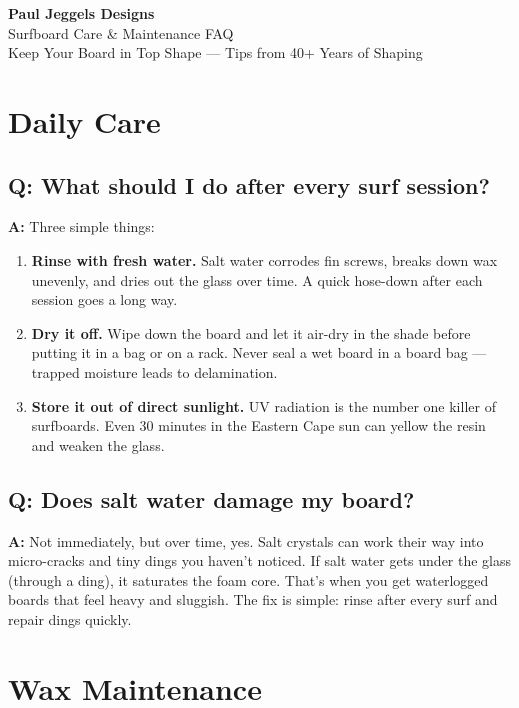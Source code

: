 \documentclass[11pt,a4paper]{article}
\newcommand{\question}[1]{\subsection*{Q: #1}}
\newcommand{\answer}{\noindent\textbf{A:} }
\begin{document}
\begin{center}
{\LARGE\bfseries\color{pjdnavy} Paul Jeggels Designs}\\[6pt]
{\Large\color{pjdnavy} Surfboard Care \& Maintenance FAQ}\\[4pt]
{\small\color{gray} Keep Your Board in Top Shape --- Tips from 40+ Years of Shaping}
\end{center}

\vspace{1em}

\section{Daily Care}

\question{What should I do after every surf session?}
\answer Three simple things:
\begin{enumerate}[leftmargin=1.5em]
    \item \textbf{Rinse with fresh water.} Salt water corrodes fin screws, breaks down wax unevenly, and dries out the glass over time. A quick hose-down after each session goes a long way.
    \item \textbf{Dry it off.} Wipe down the board and let it air-dry in the shade before putting it in a bag or on a rack. Never seal a wet board in a board bag --- trapped moisture leads to delamination.
    \item \textbf{Store it out of direct sunlight.} UV radiation is the number one killer of surfboards. Even 30 minutes in the Eastern Cape sun can yellow the resin and weaken the glass.
\end{enumerate}

\question{Does salt water damage my board?}
\answer Not immediately, but over time, yes. Salt crystals can work their way into micro-cracks and tiny dings you haven't noticed. If salt water gets under the glass (through a ding), it saturates the foam core. That's when you get waterlogged boards that feel heavy and sluggish. The fix is simple: rinse after every surf and repair dings quickly.

\section{Wax Maintenance}
\end{document}
